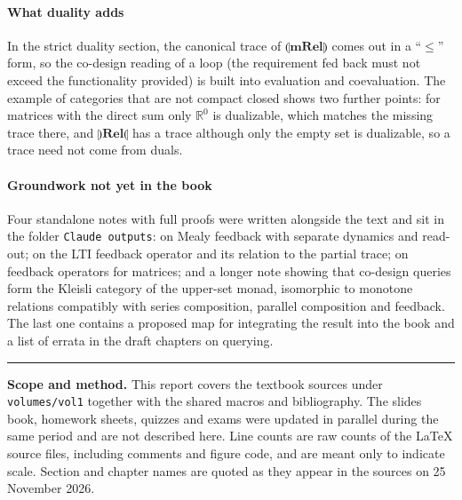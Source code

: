 \documentclass[11pt,a4paper]{article}
\newcommand{\tL}[1]{\llparenthesis\mathbf{#1}\rrparenthesis}   %
\newcommand{\tR}[1]{\rrparenthesis\mathbf{#1}\llparenthesis}   %
\newcommand{\R}{\mathbb{R}}
\newcommand{\file}[1]{{\small\texttt{#1}}}
\begin{document}
\paragraph{What duality adds} In the strict duality section, the canonical trace of $\tL{mRel}$
comes out in a ``$\leq$'' form, so the co-design reading of a loop (the requirement fed back must
not exceed the functionality provided) is built into evaluation and coevaluation. The example of
categories that are not compact closed shows two further points: for matrices with the direct sum
only $\R^0$ is dualizable, which matches the missing trace there, and $\tR{Rel}$ has a trace
although only the empty set is dualizable, so a trace need not come from duals.

\paragraph{Groundwork not yet in the book} Four standalone notes with full proofs were written
alongside the text and sit in the folder \file{Claude outputs}: on Mealy feedback with separate
dynamics and read-out; on the LTI feedback operator and its relation to the partial trace; on
feedback operators for matrices; and a longer note showing that co-design queries form the
Kleisli category of the upper-set monad, isomorphic to monotone relations compatibly with series
composition, parallel composition and feedback. The last one contains a proposed map for
integrating the result into the book and a list of errata in the draft chapters on querying.

\vspace{1.2em}
{\color{rulegray}\rule{\textwidth}{0.4pt}}

{\footnotesize\color{black!65}
\textbf{Scope and method.} This report covers the textbook sources under \file{volumes/vol1}
together with the shared macros and bibliography. The slides book, homework sheets, quizzes and
exams were updated in parallel during the same period and are not described here. Line counts are
raw counts of the \LaTeX{} source files, including comments and figure code, and are meant only to
indicate scale. Section and chapter names are quoted as they appear in the sources on
25 November 2026.}
\end{document}
